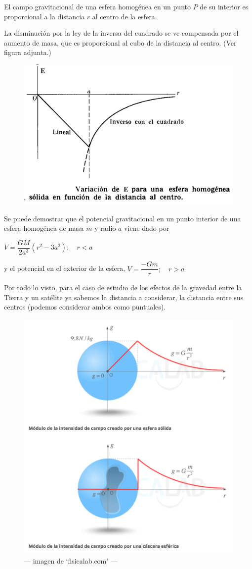 \begin{multicols}{2}
El campo gravitacional de una esfera homogénea en un punto $P$ de su interior es proporcional a la distancia $r$ al centro de la esfera.

La disminución por la ley de la inversa del cuadrado se ve compensada por el aumento de masa, que es proporcional al cubo de la distancia al centro. (Ver figura adjunta.)
\begin{figure}[H]
	\centering
	\includegraphics[width=.4\textwidth]{imagenes/imagenes14/T14IM14.png}
\end{figure}
\end{multicols}

Se puede demostrar que el potencial gravitacional en un punto interior de una esfera homogénea de masa $m$ y radio $a$ viene dado por

$V=\dfrac{GM}{2a^3}\left( r^2-3a^2 \right);\quad r<a$ 

y el potencial en el exterior de la esfera, $V=\dfrac{-Gm}{r};\quad r>a$


Por todo lo visto, para el caso de estudio de los efectos de la gravedad entre la Tierra y un satélite ya sabemos la distancia a considerar, la distancia entre sus centros (podemos considerar ambos como puntuales).

\begin{figure}[H]
	\centering
	\includegraphics[width=.95\textwidth]{imagenes/imagenes15/T15IM05.png}
	\caption*{--- imagen de `fisicalab.com' ---}
\end{figure}

